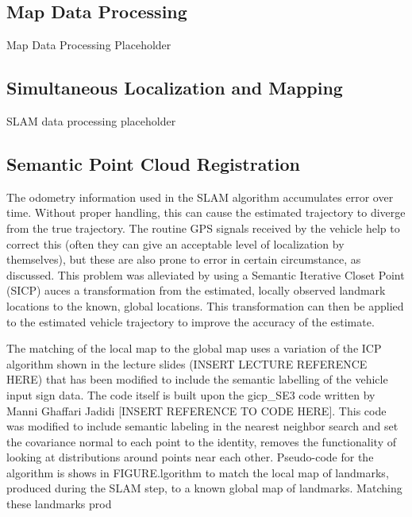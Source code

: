 \documentclass[letterpaper, 10 pt, conference]{ieeeconf}  %
\begin{document}
\subsection{Map Data Processing}

Map Data Processing Placeholder

\subsection{Simultaneous Localization and Mapping}

SLAM data processing placeholder

\subsection{Semantic Point Cloud Registration}
The odometry information used in the SLAM algorithm accumulates error over time. Without proper handling, this can cause the estimated trajectory to diverge from the true trajectory. The routine GPS signals received by the vehicle help to correct this (often they can give an acceptable level of localization by themselves), but these are also prone to error in certain circumstance, as discussed. This problem was alleviated by using a Semantic Iterative Closet Point (SICP) auces a transformation from the estimated, locally observed landmark locations to the known, global locations. This transformation can then be applied to the estimated vehicle trajectory to improve the accuracy of the estimate. 

The matching of the local map to the global map uses a variation of the ICP algorithm shown in the lecture slides (INSERT LECTURE REFERENCE HERE) that has been modified to include the semantic labelling of the vehicle input sign data. The code itself is built upon the gicp\_SE3 code written by Manni Ghaffari Jadidi [INSERT REFERENCE TO CODE HERE]. This code was modified to include semantic labeling in the nearest neighbor search and set the covariance normal to each point to the identity, removes the functionality of looking at distributions around points near each other. Pseudo-code for the algorithm is shows in FIGURE.lgorithm to match the local map of landmarks, produced during the SLAM step, to a known global map of landmarks. Matching these landmarks prod
\end{document}
